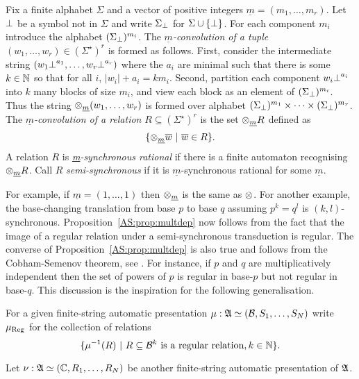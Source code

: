 \begin{definition}
Fix a finite alphabet $\Sigma$ and a vector of positive integers $\underline{m} = (m_1,\dots,m_r)$.  
Let ${\perp}$ be a symbol not in $\Sigma$ and write $\Sigma_{{\perp}}$ for $\Sigma \cup \{{\perp}\}$.
For each component $m_i$ introduce the alphabet 
$(\Sigma_{{\perp}})^{m_i}$.  The {\em $\underline{m}$-convolution of a tuple} 
$(w_1,\dots,w_r) \in (\Sigma^{\star})^r$ is formed as follows. First, consider the intermediate
string $(w_1{\perp}^{a_1}, \dots, w_r{\perp}^{a_r})$ where the $a_i$ are minimal
such that there is some $k \in \mathbb{N}$ so that for all $i$, $|w_i|+a_i = km_i$. Second,
partition each component $w_i{\perp}^{a_i}$ into $k$ many blocks of size $m_i$,
and view each block as an element of $(\Sigma_{{\perp}})^{m_i}$. Thus the string
$\otimes_{\underline{m}} (w_1,\dots,w_r)$ is formed over alphabet
$(\Sigma_{{\perp}})^{m_1} \times \cdots \times (\Sigma_{{\perp}})^{m_r}$.
The {\em $\underline{m}$-convolution of a relation} $R \subseteq (\Sigma^{\star})^r$ is the
set $\otimes_{\underline{m}} R$ defined as 
\[
\{\otimes_{\underline{m}} \mbox{$\overline {w}$} \ \vert \  \mbox{$\overline {w}$} \in R\}.
\]
A relation $R$ is {\em \underline{m}-synchronous rational} if there is a finite automaton
recognising $\otimes_{\underline{m}} R$.
Call $R$ {\em semi-synchronous} if it is $\underline{m}$-synchronous rational for some $\underline{m}$.
\end{definition}

For example, if $\underline{m} = (1,\dots, 1)$ then $\otimes_{\underline{m}}$ is the same as $\otimes$.
For another example, the base-changing translation from base $p$ to base $q$ assuming $p^k = q^l$ is $(k,l)$-synchronous. Proposition~\ref{AS:prop:multdep} now follows
from the fact that the image of a regular relation under a semi-synchronous transduction is regular. The converse of Proposition~\ref{AS:prop:multdep} is also true and follows from the Cobham-Semenov theorem, see \cite{BHMCV94}. For instance, if $p$ and $q$ are multiplicatively independent then the set of powers of $p$ is regular in base-$p$ but not
regular in base-$q$. This discussion is the inspiration for the following generalisation.

For a given finite-string automatic presentation $\mu:\mathfrak{A} \simeq ({\mathcal B},S_1,\dots,S_N)$ 
write $\mu_{\operatorname{Reg}}$ for the collection of relations
$$
\{\mu^{-1}(R) \ \vert \  R \subseteq {\mathcal B}^k \text{ is a regular relation}, k \in \mathbb{N}\}.
$$

Let $\nu:\mathfrak{A} \simeq (\mathbb{C},R_1,\dots,R_N)$ be another finite-string automatic presentation of $\mathfrak{A}$.

